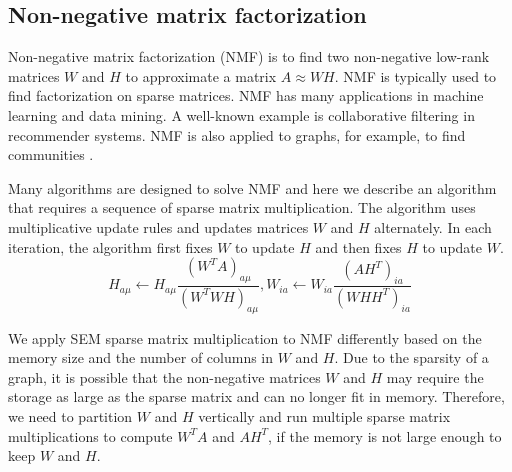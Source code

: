 \subsection{Non-negative matrix factorization}
Non-negative matrix factorization (NMF) \cite{nmf} is to find two non-negative
low-rank matrices $W$ and $H$ to approximate a matrix $A \approx WH$. NMF is
typically used to find factorization on sparse matrices. NMF has many applications
in machine learning
and data mining. A well-known example is collaborative filtering \cite{cf} in
recommender systems. NMF is also applied to graphs, for example, to find communities
\cite{yang13, wang11}.

Many algorithms are designed to solve NMF and here we describe an algorithm
\cite{nmf} that requires a sequence of sparse matrix multiplication.
The algorithm uses multiplicative update rules and updates matrices $W$ and $H$
alternately. In each iteration, the algorithm first fixes $W$ to update $H$
and then fixes $H$ to update $W$.
\begin{equation*}
H_{a\mu} \leftarrow H_{a\mu} \frac{{(W^TA)}_{a\mu}}{{(W^TWH)}_{a\mu}},
W_{ia} \leftarrow W_{ia} \frac{{(AH^T)}_{ia}}{{(WHH^T)}_{ia}}
\end{equation*}

We apply SEM sparse matrix multiplication to NMF differently
based on the memory size and the number of columns in $W$ and $H$. Due to
the sparsity of a graph, it is possible that the non-negative matrices $W$ and
$H$ may require the storage as large as the sparse matrix and can no longer fit in
memory. Therefore, we need to partition $W$ and $H$ vertically and run multiple
sparse matrix multiplications to compute $W^TA$ and $AH^T$, if the memory is not
large enough to keep $W$ and $H$.


